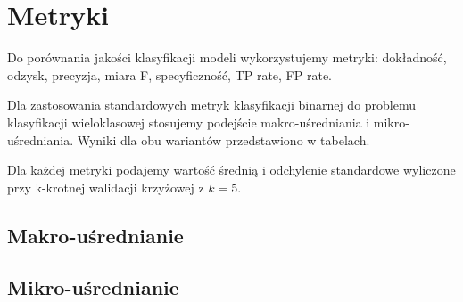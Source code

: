 \documentclass{article}
\begin{document}
\newpage
\section{Metryki}
Do porównania jakości klasyfikacji modeli wykorzystujemy metryki:
dokładność, odzysk, precyzja, miara F, specyficzność, TP rate, FP rate.

Dla zastosowania standardowych metryk klasyfikacji binarnej do problemu klasyfikacji wieloklasowej stosujemy
podejście makro-uśredniania i mikro-uśredniania. Wyniki dla obu wariantów przedstawiono w tabelach.

Dla każdej metryki podajemy wartość średnią i odchylenie standardowe wyliczone przy
k-krotnej walidacji krzyżowej z $k=5$.


\subsection{Makro-uśrednianie}
\begin{table}[h!]
    \centering
    \begin{adjustbox}{valign=c, width=\textwidth}
    \end{adjustbox}
    \label{tab:metrics-macro-1}
\end{table}

\begin{table}[h!]
    \centering
    \begin{adjustbox}{valign=c, width=\textwidth}
    \end{adjustbox}
    \label{tab:metrics-macro-2}
\end{table}

\subsection{Mikro-uśrednianie}

\begin{table}[h!]
    \centering
    \begin{adjustbox}{valign=c, width=\textwidth}
    \end{adjustbox}
    \label{tab:metrics-micro-1}
\end{table}

\begin{table}[h!]
    \centering
    \begin{adjustbox}{valign=c, width=\textwidth}
    \end{adjustbox}
    \label{tab:metrics-micro-2}
\end{table}
\end{document}

